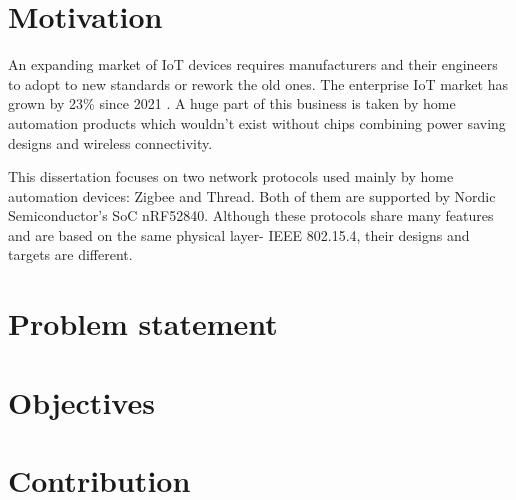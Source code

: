 
\section{Motivation}

An expanding market of IoT devices requires manufacturers and their engineers to adopt to new standards or rework 
the old ones. The enterprise IoT market has grown by 23\% since 2021 \cite{IoTMarketSize}. A huge part of this business is taken
by home automation products which wouldn't exist without chips combining power saving designs and wireless connectivity.

This dissertation focuses on two network protocols used mainly by home automation devices: Zigbee and Thread.
Both of them are supported by Nordic Semiconductor's SoC nRF52840. Although these protocols share many features
and are based on the same physical layer- IEEE 802.15.4, their designs and targets are different.

\section{Problem statement}

\section{Objectives}

\section{Contribution}
